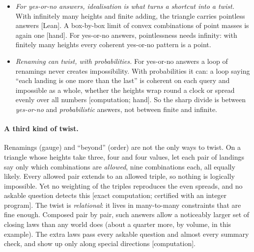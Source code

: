 \documentclass[11pt]{article}
\newcommand{\st}[1]{\textsf{\small[#1]}}
\begin{document}
\begin{itemize}[nosep]
    matters too.
  \item \emph{For yes-or-no answers, idealisation is what turns a shortcut into a
    twist.} With infinitely
    many heights and finite adding, the triangle carries pointless answers
    \st{Lean}. A box-by-box limit of convex combinations of point masses is again
    one \st{hand}. For yes-or-no answers, pointlessness needs infinity: with finitely many
    heights every coherent yes-or-no pattern is a point.
  \item \emph{Renaming can twist, with probabilities.} For yes-or-no answers a
    loop of renamings never creates impossibility. With probabilities it can: a
    loop saying ``each landing is one more than the last'' is coherent on each
    query and impossible as a whole, whether the heights wrap round a clock or
    spread evenly over all numbers \st{computation; hand}. So the sharp divide is
    between \emph{yes-or-no} and \emph{probabilistic} answers, not between finite
    and infinite.
\end{itemize}

\paragraph{A third kind of twist.} Renamings (gauge) and ``beyond'' (order) are not
the only ways to twist. On a triangle whose heights take three, four and four
values, let each pair of landings say only which combinations are
\emph{allowed}, nine combinations each, all equally likely. Every allowed pair
extends to an allowed triple, so nothing is logically impossible. Yet no
weighting of the triples reproduces the even spreads, and no askable question
detects this \st{exact computation; certified with an integer program}. The
twist is \emph{relational}: it lives in many-to-many constraints that are fine
enough. Composed pair by pair, such answers allow a noticeably larger set of
closing laws than any world does (about a quarter more, by volume, in this
example). The extra laws pass every askable question and almost every summary
check, and show up only along special directions \st{computation}.
\end{document}
